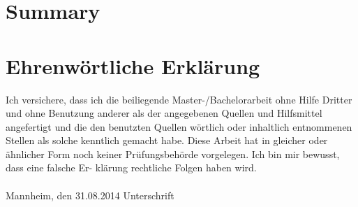 \documentclass[11pt,titlepage,oneside,openany]{article}
\begin{document}
\section{Summary}






\appendix


\newpage


\pagestyle{empty}


\section*{Ehrenw\"ortliche Erkl\"arung}
Ich versichere, dass ich die beiliegende Master-/Bachelorarbeit ohne Hilfe Dritter
und ohne Benutzung anderer als der angegebenen Quellen und Hilfsmittel
angefertigt und die den benutzten Quellen w\"ortlich oder inhaltlich
entnommenen Stellen als solche kenntlich gemacht habe. Diese Arbeit
hat in gleicher oder \"ahnlicher Form noch keiner Pr\"ufungsbeh\"orde
vorgelegen. Ich bin mir bewusst, dass eine falsche Er- kl\"arung rechtliche Folgen haben
wird.
\\
\\

\noindent
Mannheim, den 31.08.2014 \hspace{4cm} Unterschrift
\end{document}
